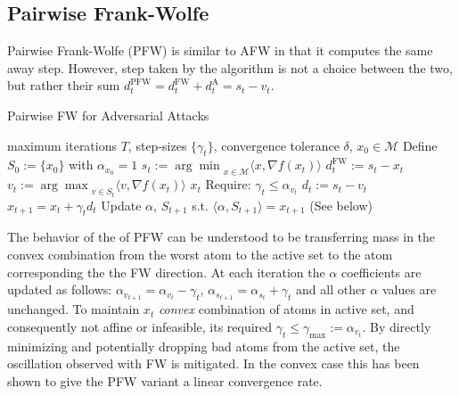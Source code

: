 \documentclass{article}
\begin{document}
\subsection{Pairwise Frank-Wolfe}
Pairwise Frank-Wolfe (PFW) is similar to AFW in that it computes the same away step. However, step taken by the algorithm is not a choice between the two, but rather their sum $d_t^\text{PFW} = d_t^\text{FW} + d_t^\text{A} = s_t - v_t$. 

\begin{algorithm}[H]
\caption{Pairwise FW for Adversarial Attacks}\label{alg:cap}
\begin{algorithmic}[1]
\Require maximum iterations $T$, step-sizes $\{\gamma_t\}$, convergence tolerance $\delta$, $x_0 \in \mathcal{M}$
\State Define $S_0 := \{x_0\}$ with $\alpha_{x_0} = 1$
	\State $s_t  := {\arg \min}_{x\in\mathcal{M}} \langle x, \nabla f(x_t)\rangle$ 
	\State $d_t^{\text{FW}} := s_t - x_t$
	\State $v_t  := {\arg \max}_{v\in S_t} \langle v, \nabla f(x_t)\rangle$
	  $x_t$ \hfill {}
	\EndIf
	\State Require: $\gamma_t \leq \alpha_{v_t}$
	\State $d_t := s_t - v_t$
	\State $x_{t+1} = x_t + \gamma_t d_t$
	\State Update $\alpha$, $S_{t+1}$ s.t. $\langle \alpha, S_{t+1}\rangle = x_{t+1}$ (See below)
\EndFor
\end{algorithmic}
\end{algorithm}

The behavior of the of PFW can be understood to be transferring mass in the convex combination from the worst atom to the active set to the atom corresponding the the FW direction. At each iteration the $\alpha$ coefficients are updated as follows: $\alpha_{v_{t+1}} = \alpha_{v_t} - \gamma_t$, $\alpha_{s_{t+1}} = \alpha_{s_t} + \gamma_t$ and all other $\alpha$ values are unchanged. To maintain $x_t$ \emph{convex} combination of atoms in active set, and consequently not affine or infeasible, its required $\gamma_t \leq \gamma_\text{max} := \alpha_{v_t}$. By directly minimizing and potentially dropping bad atoms from the active set, the oscillation observed with FW is mitigated. In the convex case this has been shown to give the PFW variant a linear convergence rate.
\end{document}
